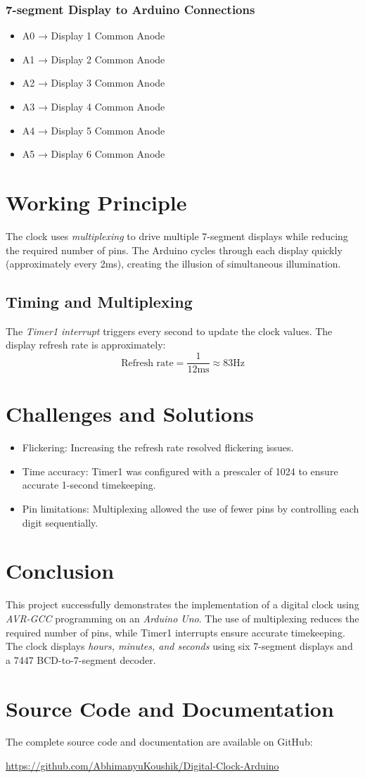 \documentclass{article}
\begin{document}
\subsubsection{7-segment Display to Arduino Connections}
\begin{itemize}
    \item A0 → Display 1 Common Anode
    \item A1 → Display 2 Common Anode
    \item A2 → Display 3 Common Anode
    \item A3 → Display 4 Common Anode
    \item A4 → Display 5 Common Anode
    \item A5 → Display 6 Common Anode
\end{itemize}

\section{Working Principle}
The clock uses \textit{multiplexing} to drive multiple 7-segment displays while reducing the required number of pins. The Arduino cycles through each display quickly (approximately every 2ms), creating the illusion of simultaneous illumination.

\subsection{Timing and Multiplexing}
The \textit{Timer1 interrupt} triggers every second to update the clock values. The display refresh rate is approximately:
\[
\text{{Refresh rate}} = \frac{1}{12\text{ms}} \approx 83\text{Hz}
\]

\section{Challenges and Solutions}
\begin{itemize}
    \item Flickering: Increasing the refresh rate resolved flickering issues.
    \item Time accuracy: Timer1 was configured with a prescaler of 1024 to ensure accurate 1-second timekeeping.
    \item Pin limitations: Multiplexing allowed the use of fewer pins by controlling each digit sequentially.
\end{itemize}

\section{Conclusion}
This project successfully demonstrates the implementation of a digital clock using \textit{AVR-GCC} programming on an \textit{Arduino Uno}. The use of multiplexing reduces the required number of pins, while Timer1 interrupts ensure accurate timekeeping. The clock displays \textit{hours, minutes, and seconds} using six 7-segment displays and a 7447 BCD-to-7-segment decoder.

\section{Source Code and Documentation}
The complete source code and documentation are available on GitHub:
\begin{center}
\href{https://github.com/AbhimanyuKoushik/nice_stuff/tree/main/codes/Arduino/Clock/clock_Decoder}{https://github.com/AbhimanyuKoushik/Digital-Clock-Arduino}
\end{center}
\end{document}
